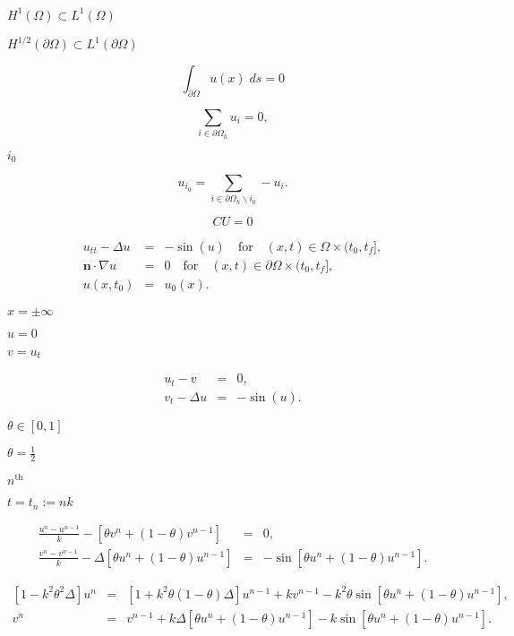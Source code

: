 \documentclass{article}
\begin{document}
$H^1(\Omega)\subset L^1(\Omega)$
\pagebreak

$H^{1/2}(\partial\Omega)\subset L^1(\partial\Omega)$
\pagebreak

\[ \int_{\partial \Omega} u(x) \; ds = 0 \]
\pagebreak

\[ \sum_{i\in\partial\Omega_h} u_i = 0, \]
\pagebreak

$i_0$
\pagebreak

\[ u_{i_0} = \sum_{i\in\partial\Omega_h\backslash i_0} -u_i. \]
\pagebreak

\[ CU = 0 \]
\pagebreak

\begin{eqnarray*} u_{tt}-\Delta u &=& -\sin(u) \quad\mbox{for}\quad (x,t) \in \Omega \times (t_0,t_f],\\ {\mathbf n} \cdot \nabla u &=& 0 \quad\mbox{for}\quad (x,t) \in \partial\Omega \times (t_0,t_f],\\ u(x,t_0) &=& u_0(x). \end{eqnarray*}
\pagebreak

$x=\pm\infty$
\pagebreak

$u=0$
\pagebreak

$v = u_t$
\pagebreak

\begin{eqnarray*} u_t - v &=& 0,\\ v_t - \Delta u &=& -\sin(u). \end{eqnarray*}
\pagebreak

$\theta\in [0,1]$
\pagebreak

$\theta=\frac{1}{2}$
\pagebreak

$n^{\mathrm{th}}$
\pagebreak

$t=t_n:= n k$
\pagebreak

\begin{eqnarray*} \frac{u^n - u^{n-1}}{k} - \left[\theta v^n + (1-\theta) v^{n-1}\right] &=& 0,\\ \frac{v^n - v^{n-1}}{k} - \Delta\left[\theta u^n + (1-\theta) u^{n-1}\right] &=& -\sin\left[\theta u^n + (1-\theta) u^{n-1}\right]. \end{eqnarray*}
\pagebreak

\begin{eqnarray*} \left[ 1-k^2\theta^2\Delta \right] u^n &=& \left[ 1+k^2\theta(1-\theta)\Delta\right] u^{n-1} + k v^{n-1} - k^2\theta\sin\left[\theta u^n + (1-\theta) u^{n-1}\right],\\ v^n &=& v^{n-1} + k\Delta\left[ \theta u^n + (1-\theta) u^{n-1}\right] - k\sin\left[ \theta u^n + (1-\theta) u^{n-1} \right]. \end{eqnarray*}
\pagebreak
\end{document}
